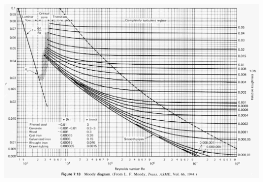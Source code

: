 \begin{minipage}[r]{1.0\textwidth}
 \centering
  \includegraphics[width=1.0\textwidth]{./fig/MoodyChart.jpg}
\end{minipage}

